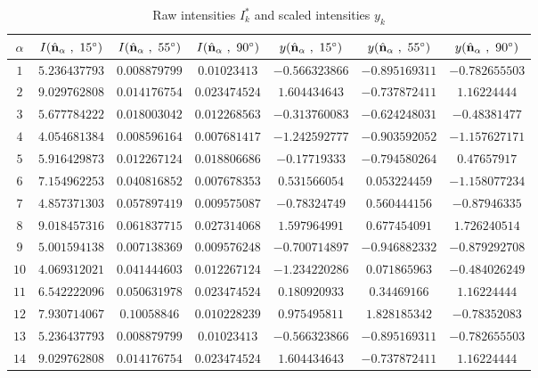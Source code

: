\documentclass[12pt]{spieman}
\begin{document}
\begin{table}[h]
	\begin{center}
		\caption{\label{tab:A2}
			Raw intensities $I_k^*$ and scaled intensities $y_k$}
		\begin{tabular}{|c|c|c|c|c|c|c|}
			\hline\hline
			$\alpha$  & $I(\hat{\bf n}_\alpha\ ,\ 15^{\circ})$ &  $I(\hat{\bf n}_\alpha \ , \ 55^{\circ})$ &  $I(\hat{\bf n}_\alpha \ ,\ 90^{\circ})$ & $y(\hat{\bf n}_\alpha \ , \ 15^{\circ})$ & $y(\hat{\bf n}_\alpha \ , \ 55^{\circ})$ & $y(\hat{\bf n}_\alpha \ , \ 90^{\circ})$ \\
		    \hline
			$1$ & $5.236437793$ & $0.008879799$ & $0.01023413$ & $-0.566323866$ & $-0.895169311$ & $-0.782655503$ \\
			$2$ & $9.029762808$ & $0.014176754$ & $0.023474524$ & $1.604434643$ & $-0.737872411$ & $1.16224444$ \\
			$3$ & $5.677784222$ & $0.018003042$ & $0.012268563$ & $-0.313760083$ & $-0.624248031$ & $-0.48381477$ \\
			$4$ & $4.054681384$ & $0.008596164$ & $0.007681417$ & $-1.242592777$ & $-0.903592052$ & $-1.157627171$ \\
			$5$ & $5.916429873$ & $0.012267124$ & $0.018806686$ & $-0.17719333$ & $-0.794580264$ & $0.47657917$ \\
			$6$ & $7.154962253$ & $0.040816852$ & $0.007678353$ & $0.531566054$ & $0.053224459$ & $-1.158077234$ \\
			$7$ & $4.857371303$ & $0.057897419$ & $0.009575087$ & $-0.78324749$ & $0.560444156$ & $-0.87946335$ \\
			$8$ & $9.018457316$ & $0.061837715$ & $0.027314068$ & $1.597964991$ & $0.677454091$ & $1.726240514$ \\
			$9$ & $5.001594138$ & $0.007138369$ & $0.009576248$ & $-0.700714897$ & $-0.946882332$ & $-0.879292708$ \\
			$10$ & $4.069312021$ & $0.041444603$ & $0.012267124$ & $-1.234220286$ & $0.071865963$ & $-0.484026249$ \\
			$11$ & $6.542222096$ & $0.050631978$ & $0.023474524$ & $0.180920933$ & $0.34469166$ & $1.16224444$ \\
			$12$ & $7.930714067$ & $0.10058846$ & $0.010228239$ & $0.975495811$ & $1.828185342$ & $-0.78352083$ \\
			$13$ & $5.236437793$ & $0.008879799$ & $0.01023413$ & $-0.566323866$ & $-0.895169311$ & $-0.782655503$ \\
			$14$ & $9.029762808$ & $0.014176754$ & $0.023474524$ & $1.604434643$ & $-0.737872411$ & $1.16224444$ \\

\end{tabular}
\end{center}
\end{table}
\end{document}
